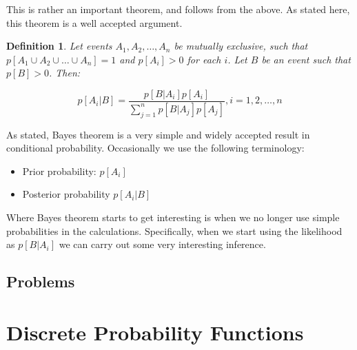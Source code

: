 \documentclass[12pt]{extbook}
\newtheorem{df}{Definition}[section]
\begin{document}
This is rather an important theorem, and follows from the above.   As stated here, this theorem is a well accepted argument.

\begin{df}
Let events $A_1, A_2, \ldots, A_n$ be mutually exclusive, such that $p[A_1 \cup A_2 \cup \ldots \cup A_n] = 1$ and $p[A_i] > 0$ for each $i$.   Let $B$ be an event such that $p[B] > 0$.  Then:

\begin{displaymath}
p[A_i | B] = \frac{p[B|A_i]p[A_i]}{\sum_{j=1}^n p[B|A_j]p[A_j]}, i=1,2,\ldots, n
\end{displaymath}
\end{df}

 

As stated, Bayes theorem is a very simple and widely accepted result in conditional probability.   Occasionally we use the following terminology:

\begin{itemize}
\item Prior probability: $p[A_i]$
\item Posterior probability $p[A_i | B]$
\end{itemize}


Where Bayes theorem starts to get interesting is when we no longer use simple probabilities in the calculations.  Specifically, when we start using the likelihood as $p[B|A_i]$ we can carry out some very interesting inference.

\section{Problems}

\begin{enumerate}











\end{enumerate}





\chapter{Discrete Probability Functions}
\end{document}
